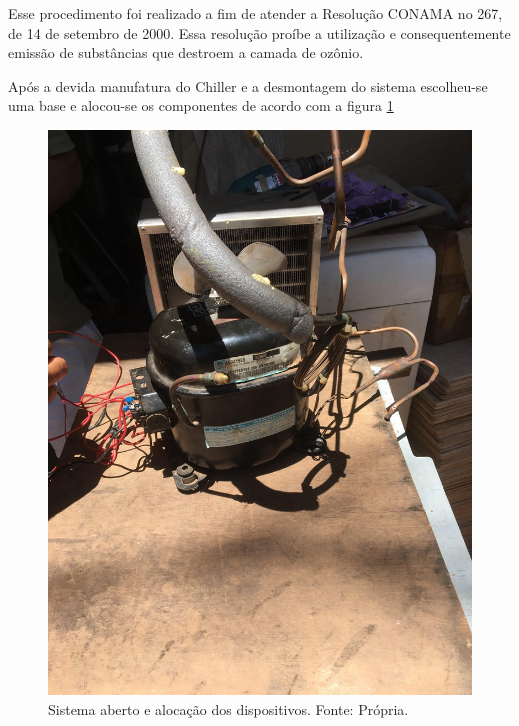                         Esse procedimento foi realizado a fim de atender a Resolução CONAMA no 267, de 14 de
                        setembro de 2000. Essa resolução proíbe a utilização e consequentemente emissão
                        de substâncias que destroem a camada de ozônio. 

                        Após a devida manufatura do Chiller e a desmontagem do sistema escolheu-se uma
                        base e alocou-se os componentes de acordo com a figura \ref{alocacao-dispositivos} 

                        \begin{figure}[!htb]
                            \centering
                            \includegraphics[scale= 0.2]{figuras/alocacao-dispositivos.png}
                            \caption{Sistema aberto e alocação dos dispositivos. Fonte: Própria.}
                            \label{alocacao-dispositivos}
                        \end{figure}

